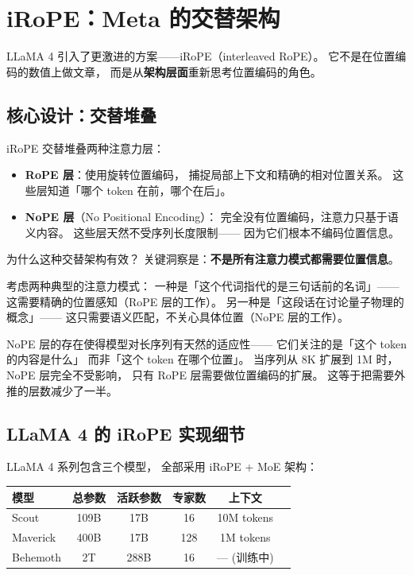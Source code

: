 \section{iRoPE：Meta 的交替架构}

LLaMA 4 引入了更激进的方案——iRoPE（interleaved RoPE）。
它不是在位置编码的数值上做文章，
而是从\textbf{架构层面}重新思考位置编码的角色。

\subsection{核心设计：交替堆叠}

iRoPE 交替堆叠两种注意力层：
\begin{itemize}[noitemsep]
  \item \textbf{RoPE 层}：使用旋转位置编码，
        捕捉局部上下文和精确的相对位置关系。
        这些层知道「哪个 token 在前，哪个在后」。
  \item \textbf{NoPE 层}（No Positional Encoding）：
        完全没有位置编码，注意力只基于语义内容。
        这些层天然不受序列长度限制——
        因为它们根本不编码位置信息。
\end{itemize}

为什么这种交替架构有效？
关键洞察是：\textbf{不是所有注意力模式都需要位置信息}。

考虑两种典型的注意力模式：
一种是「这个代词指代的是三句话前的名词」——
这需要精确的位置感知（RoPE 层的工作）。
另一种是「这段话在讨论量子物理的概念」——
这只需要语义匹配，不关心具体位置（NoPE 层的工作）。

NoPE 层的存在使得模型对长序列有天然的适应性——
它们关注的是「这个 token 的内容是什么」
而非「这个 token 在哪个位置」。
当序列从 8K 扩展到 1M 时，
NoPE 层完全不受影响，
只有 RoPE 层需要做位置编码的扩展。
这等于把需要外推的层数减少了一半。

\subsection{LLaMA 4 的 iRoPE 实现细节}

LLaMA 4 系列包含三个模型，
全部采用 iRoPE + MoE 架构：

\begin{center}
\begin{tabular}{lccccc}
\hline
\textbf{模型} & \textbf{总参数} & \textbf{活跃参数} & \textbf{专家数} & \textbf{上下文} \\
\hline
Scout   & 109B  & 17B  & 16    & 10M tokens \\
Maverick & 400B & 17B  & 128   & 1M tokens \\
Behemoth & 2T   & 288B & 16    & --- (训练中) \\
\hline
\end{tabular}
\end{center}


